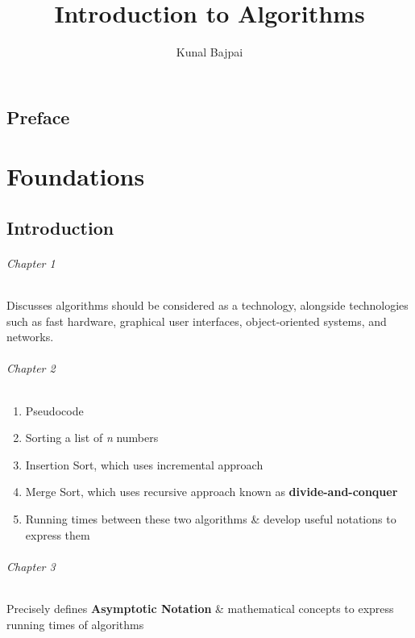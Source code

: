 \documentclass[letterpaper]{book}
\title{Introduction to Algorithms}
\author{Kunal Bajpai}
\begin{document}
	\frontmatter

	\maketitle
	\tableofcontents
	\noindent
	\hrulefill

	\chapter*{Preface}
	\Blindtext
	\newpage

	\mainmatter
	\part{Foundations}
	\chapter*{Introduction}
	\hrulefill

	\paragraph{Chapter 1}
	Discusses algorithms should be considered as a technology, alongside technologies such as fast hardware, graphical user interfaces, object-oriented systems, and networks.

	\paragraph{Chapter 2}
	\begin{enumerate}
		\item Pseudocode 
		\item Sorting a list of \textit{n} numbers
		\item Insertion Sort, which uses incremental approach
		\item Merge Sort, which uses recursive approach known as \textbf{divide-and-conquer}
		\item Running times between these two algorithms \& develop useful notations to express them 
	\end{enumerate}
	
	\paragraph{Chapter 3} 
	Precisely defines \textbf{Asymptotic Notation} \& mathematical concepts to express running times of algorithms 
\end{document}
